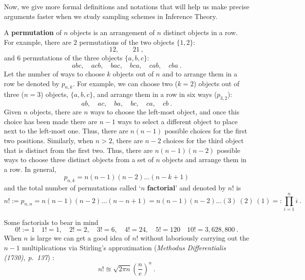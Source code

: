 \medskip
Now, we give more formal definitions and notations that will help us make precise arguments faster when we study sampling schemes in Inference Theory.

\begin{definition}
A {\bf permutation} of $n$ objects is an arrangement of $n$ distinct objects in a row.  For example, there are $2$ permutations of the two objects $\{1,2\}$:
\[
12, \qquad 21 \ ,
\]
and $6$ permutations of the three objects $\{a,b,c\}$:
\[
abc, \quad acb, \quad bac, \quad bca, \quad cab, \quad cba \ .
\]
Let the number of ways to choose $k$ objects out of $n$ and to arrange them in a row be denoted by $p_{n,k}$.  For example, we can choose two ($k=2$) objects out of three ($n=3$) objects, $\{a,b,c\}$, and arrange them in a row in six ways ($p_{3,2}$):
\[
ab, \quad ac, \quad ba, \quad bc, \quad ca, \quad cb \ .
\]
Given $n$ objects, there are $n$ ways to choose the left-most object, and once this choice has been made there are $n-1$ ways to select a different object to place next to the left-most one.  Thus, there are $n(n-1)$ possible choices for the first two positions.  Similarly, when $n>2$, there are $n-2$ choices for the third object that is distinct from the first two.  Thus, there are $n(n-1)(n-2)$ possible ways to choose three distinct objects from a set of $n$ objects and arrange them in a row.  In general, 
\[
p_{n,k} = n(n-1)(n-2)\ldots (n-k+1)
\]
and the total number of permutations called `$n$ {\bf factorial}' and denoted by $n!$ is
\[
n! := p_{n,n} = n (n-1) (n-2)\ldots (n-n+1) = n (n-1) (n-2)\ldots (3) \ (2) \ (1) =: \prod_{i=1}^n i \ .
\]
\end{definition}

Some factorials to bear in mind
\[
0! := 1 \quad 1!=1, \quad 2!=2, \quad 3!=6, \quad 4!=24, \quad 5!=120 \quad 10!=3,628,800 \ .
\]
When $n$ is large we can get a good idea of $n!$ without laboriously carrying out the $n-1$ multiplications via Stirling's approximation ({\it Methodus Differentialis (1730), p.~137}) :
\[
n! \approxeq \sqrt{2 \pi n} \left( \frac{n}{e} \right)^n \ .
\]


